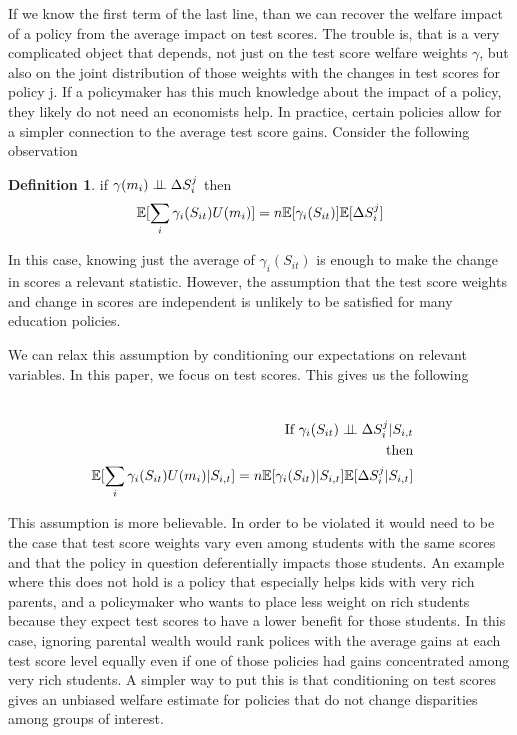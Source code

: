 \documentclass{article}
\theoremstyle{definition}
\theoremstyle{definition}
\theoremstyle{definition}
\theoremstyle{definition}
\newtheorem{definition}{Definition}
\begin{document}
    If we know the first term of the last line, than we can recover the welfare impact of a policy from the average impact on test scores. The trouble is, that is a very complicated object that depends, not just on the test score welfare weights $\gamma$, but also on the joint distribution of those weights with the changes in test scores for policy j. If a policymaker has this much knowledge about the impact of a policy, they likely do not need an economists help. In practice, certain policies allow for a simpler connection to the average test score gains. Consider the following observation 
    
    \large
    \begin{definition}
    if $\gamma(m_i) \perp \!\!\! \perp \Delta S_i^j$ then 
    \begin{equation}
        \mathbb{E}[\sum_i \gamma_i(S_{it})U(m_i)]= n\mathbb{E}[\gamma_i(S_{it})]\mathbb{E}[\Delta S_i^j]
    \end{equation}
    \end{definition}
    
    \normalsize
    In this case, knowing just the average of $\gamma_i(S_{it})$ is enough to make the change in scores a relevant statistic. However, the assumption that the test score weights and change in scores are independent is unlikely to be satisfied for many education policies. 
    
    We can relax this assumption by conditioning our expectations on relevant variables. In this paper, we focus on test scores. This gives us the following 
    
    \large
    \begin{align*}
    
       \\ \text{If  }   \gamma_i(S_{it}) \indep \Delta S_i^j | S_{i,t} &
        \\ \text{then} &
       \\ \E[\sum_i \gamma_i(S_{it})U(m_i)| S_{i,t}]= n\E[\gamma_i(S_{it})|S_{i,t}]\E[\Delta S_i^j|S_{i,t}] &
    \end{align*}
    \normalsize
    
    This assumption is more believable. In order to be violated it would need to be the case that test score weights vary even among students with the same scores and that the policy in question deferentially impacts those students. An example where this does not hold is a policy that especially helps kids with very rich parents, and a policymaker who wants to place less weight on rich students because they expect test scores to have a lower benefit for those students. In this case, ignoring parental wealth would rank polices with the average gains at each test score level equally even if one of those policies had gains concentrated among very rich students. A simpler way to put this is that conditioning on test scores gives an unbiased welfare estimate for policies that do not change disparities among groups of interest. 
    
\end{document}
